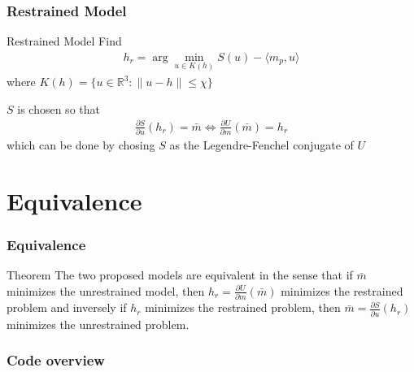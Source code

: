 \documentclass[utf8,aspectratio=169,ngerman,english]{beamer}
\begin{document}
\begin{frame}
\frametitle{Restrained Model}
\begin{block}{Restrained Model}
Find
 \begin{align}
  h_r = \arg \min_{u \in K(h)} S(u) - \langle m_p , u \rangle
 \end{align}
where $K(h) = \{u \in \mathbb R^3: \|u - h\| \leq \chi \}$
\end{block}
$S$ is chosen so that
\begin{align}
 \frac{\partial S}{\partial u}(h_r) = \bar m \Leftrightarrow \frac{\partial U}{\partial m}(\bar m) = h_r
\end{align} which can be done by chosing $S$ as the Legendre-Fenchel conjugate of $U$


\end{frame}

\section{Equivalence}
\begin{frame}
\frametitle{Equivalence}
\begin{block}{Theorem}
 The two proposed models are equivalent in the sense that if $\bar m$ minimizes the unrestrained model, then $h_r = \frac{\partial U}{\partial m}(\bar m)$ minimizes the restrained problem and inversely if $h_r$ minimizes the restrained problem, then $\bar m = \frac{\partial S}{\partial u}(h_r)$ minimizes the unrestrained problem.
\end{block}

\end{frame}

\begin{frame}
 \frametitle{Code overview}

\end{frame}
\end{document}

